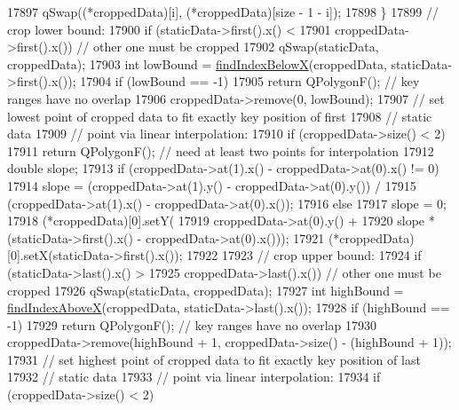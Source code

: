 \begin{DoxyCode}
17897         qSwap((*croppedData)[i], (*croppedData)[size - 1 - i]);
17898     \}
17899     \textcolor{comment}{// crop lower bound:}
17900     \textcolor{keywordflow}{if} (staticData->first().x() <
17901         croppedData->first().x()) \textcolor{comment}{// other one must be cropped}
17902       qSwap(staticData, croppedData);
17903     \textcolor{keywordtype}{int} lowBound = \hyperlink{class_q_c_p_graph_a6f4e9461d5925be9228fc4760249a04f}{findIndexBelowX}(croppedData, staticData->first().x());
17904     \textcolor{keywordflow}{if} (lowBound == -1)
17905       \textcolor{keywordflow}{return} QPolygonF(); \textcolor{comment}{// key ranges have no overlap}
17906     croppedData->remove(0, lowBound);
17907     \textcolor{comment}{// set lowest point of cropped data to fit exactly key position of first}
17908     \textcolor{comment}{// static data}
17909     \textcolor{comment}{// point via linear interpolation:}
17910     \textcolor{keywordflow}{if} (croppedData->size() < 2)
17911       \textcolor{keywordflow}{return} QPolygonF(); \textcolor{comment}{// need at least two points for interpolation}
17912     \textcolor{keywordtype}{double} slope;
17913     \textcolor{keywordflow}{if} (croppedData->at(1).x() - croppedData->at(0).x() != 0)
17914       slope = (croppedData->at(1).y() - croppedData->at(0).y()) /
17915               (croppedData->at(1).x() - croppedData->at(0).x());
17916     \textcolor{keywordflow}{else}
17917       slope = 0;
17918     (*croppedData)[0].setY(
17919         croppedData->at(0).y() +
17920         slope * (staticData->first().x() - croppedData->at(0).x()));
17921     (*croppedData)[0].setX(staticData->first().x());
17922 
17923     \textcolor{comment}{// crop upper bound:}
17924     \textcolor{keywordflow}{if} (staticData->last().x() >
17925         croppedData->last().x()) \textcolor{comment}{// other one must be cropped}
17926       qSwap(staticData, croppedData);
17927     \textcolor{keywordtype}{int} highBound = \hyperlink{class_q_c_p_graph_abab2a75b5e63630432bdd1f3b57f07fa}{findIndexAboveX}(croppedData, staticData->last().x());
17928     \textcolor{keywordflow}{if} (highBound == -1)
17929       \textcolor{keywordflow}{return} QPolygonF(); \textcolor{comment}{// key ranges have no overlap}
17930     croppedData->remove(highBound + 1, croppedData->size() - (highBound + 1));
17931     \textcolor{comment}{// set highest point of cropped data to fit exactly key position of last}
17932     \textcolor{comment}{// static data}
17933     \textcolor{comment}{// point via linear interpolation:}
17934     \textcolor{keywordflow}{if} (croppedData->size() < 2)

\end{DoxyCode}
